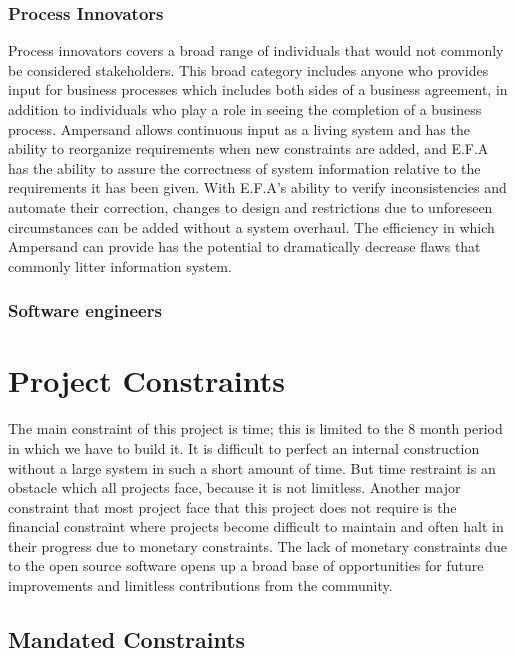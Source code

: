 \documentclass[12pt]{report}
\begin{document}
\subsection{Process Innovators}
Process innovators covers a broad range of individuals that would not commonly 
be considered stakeholders. This broad category includes anyone who provides 
input for business processes which includes both sides of a business agreement, 
in addition to individuals who play a role in seeing the completion of a 
business process. Ampersand allows continuous input as a living system and has 
the ability to reorganize requirements when new constraints are added, and 
E.F.A has the ability to assure the correctness of system information relative 
to the requirements it has been given. With E.F.A's ability to verify 
inconsistencies and automate their correction, changes to design and 
restrictions due to unforeseen circumstances can be added without a system 
overhaul. The efficiency in which Ampersand can provide has the potential to 
dramatically decrease flaws that commonly litter information system.

\subsection{Software engineers}\label{subsec:SftwReq}

\chapter{Project Constraints}\label{ch:Constraints}
The main constraint of this project is time; this is limited to the 8 month 
period in which we have to build it. It is difficult to perfect an internal 
construction without a large system in such a short amount of time. But time 
restraint is an obstacle which all projects face, because it is not limitless. 
Another major constraint that most project face that this project does not 
require is the financial constraint where projects become difficult to maintain 
and often halt in their progress due to monetary constraints. The lack of 
monetary constraints due to the open source software opens up a broad base of 
opportunities for future improvements and limitless contributions from the 
community.
\section{Mandated Constraints}\label{sec:Constraints}
\end{document}
